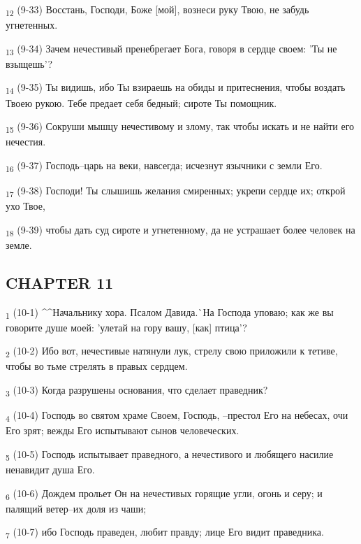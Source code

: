 \begin{tcolorbox}
\textsubscript{12} (9-33) Восстань, Господи, Боже [мой], вознеси руку Твою, не забудь угнетенных.
\end{tcolorbox}
\begin{tcolorbox}
\textsubscript{13} (9-34) Зачем нечестивый пренебрегает Бога, говоря в сердце своем: 'Ты не взыщешь'?
\end{tcolorbox}
\begin{tcolorbox}
\textsubscript{14} (9-35) Ты видишь, ибо Ты взираешь на обиды и притеснения, чтобы воздать Твоею рукою. Тебе предает себя бедный; сироте Ты помощник.
\end{tcolorbox}
\begin{tcolorbox}
\textsubscript{15} (9-36) Сокруши мышцу нечестивому и злому, так чтобы искать и не найти его нечестия.
\end{tcolorbox}
\begin{tcolorbox}
\textsubscript{16} (9-37) Господь--царь на веки, навсегда; исчезнут язычники с земли Его.
\end{tcolorbox}
\begin{tcolorbox}
\textsubscript{17} (9-38) Господи! Ты слышишь желания смиренных; укрепи сердце их; открой ухо Твое,
\end{tcolorbox}
\begin{tcolorbox}
\textsubscript{18} (9-39) чтобы дать суд сироте и угнетенному, да не устрашает более человек на земле.
\end{tcolorbox}
\subsection{CHAPTER 11}
\begin{tcolorbox}
\textsubscript{1} (10-1) ^^Начальнику хора. Псалом Давида.^^ На Господа уповаю; как же вы говорите душе моей: 'улетай на гору вашу, [как] птица'?
\end{tcolorbox}
\begin{tcolorbox}
\textsubscript{2} (10-2) Ибо вот, нечестивые натянули лук, стрелу свою приложили к тетиве, чтобы во тьме стрелять в правых сердцем.
\end{tcolorbox}
\begin{tcolorbox}
\textsubscript{3} (10-3) Когда разрушены основания, что сделает праведник?
\end{tcolorbox}
\begin{tcolorbox}
\textsubscript{4} (10-4) Господь во святом храме Своем, Господь, --престол Его на небесах, очи Его зрят; вежды Его испытывают сынов человеческих.
\end{tcolorbox}
\begin{tcolorbox}
\textsubscript{5} (10-5) Господь испытывает праведного, а нечестивого и любящего насилие ненавидит душа Его.
\end{tcolorbox}
\begin{tcolorbox}
\textsubscript{6} (10-6) Дождем прольет Он на нечестивых горящие угли, огонь и серу; и палящий ветер--их доля из чаши;
\end{tcolorbox}
\begin{tcolorbox}
\textsubscript{7} (10-7) ибо Господь праведен, любит правду; лице Его видит праведника.
\end{tcolorbox}
